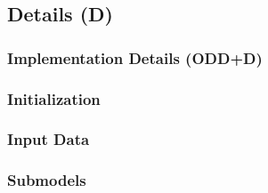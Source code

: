 \documentclass[
  man,
  10pt,
  a4paper,
  floatsintext
]{apa7}
\begin{document}
\subsection{Details (D)}

\subsubsection{Implementation Details (ODD+D)}

\begin{guidingbox}
\end{guidingbox}

\subsubsection{Initialization}

\begin{guidingbox}
\end{guidingbox}

\subsubsection{Input Data}

\begin{guidingbox}
\end{guidingbox}

\subsubsection{Submodels}

\begin{guidingbox}
\end{guidingbox}
\end{document}
